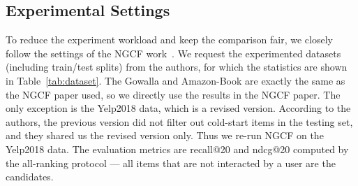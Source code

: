 \documentclass[sigconf]{acmart}
\theoremstyle{definition}
\begin{document}
\subsection{Experimental Settings}\label{ss:setting}
To reduce the experiment workload and keep the comparison fair, we closely follow the settings of the NGCF work~\cite{NGCF}. We request the experimented datasets (including train/test splits) from the authors, for which the statistics are shown in Table~\ref{tab:dataset}. 
The Gowalla and Amazon-Book are exactly the same as the NGCF paper used, so we directly use the results in the NGCF paper. The only exception is the Yelp2018 data, which is a revised version. According to the authors, the previous version did not filter out cold-start items in the testing set, and they shared us the revised version only. Thus we re-run NGCF on the Yelp2018 data.
The evaluation metrics are recall@20 and ndcg@20 computed by the all-ranking protocol --- all items that are not interacted by a user are the candidates. 
\end{document}
